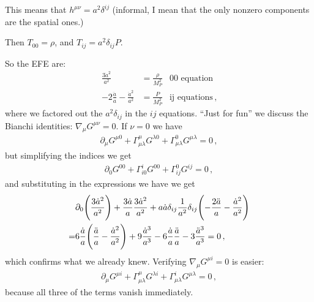\documentclass[main.tex]{subfiles}
\begin{document}
This means that \(h^{\mu \nu } = a^2 \delta^{ij}\) (informal, I mean that the only nonzero components are the spatial ones.)

Then \(T_{00} = \rho \), and \(T_{ij} = a^2 \delta_{ij} P\). 

So the EFE are: 
%
\begin{subequations}
\begin{align}
  \frac{3 \dot{a}^2}{a^2} &= \frac{\rho }{M_P^2}  & \text{00 equation}\\
  - 2 \frac{\ddot{a}}{a} - \frac{\dot{a}^2}{a^2} &=
  \frac{P}{M_P^2} & \text{ij equations}
\,,
\end{align}
\end{subequations}
%
where we factored out the \(a^2 \delta_{ij}\) in the \(ij\) equations. 
``Just for fun'' we discuss the Bianchi identities: \(\nabla_{\mu } G^{\mu \nu }=0\). 
If \(\nu =0\) we have 
%
\begin{align}
  \partial_{\mu } G^{\mu 0} + \Gamma^{\mu }_{\mu \lambda } G^{\lambda 0} + \Gamma^{0}_{\mu \lambda } G^{\mu \lambda } = 0
\,,
\end{align}
%
but simplifying the indices we get 
%
\begin{align}
  \partial_{0} G^{00} + \Gamma^{i}_{i0} G^{00} + \Gamma^{0}_{ij} G^{ij} =0
\,,
\end{align}
%
and substituting in the expressions we have we get 
%
\begin{subequations}
\begin{align}
  &\partial_{0} \qty(\frac{3 \dot{a}^2}{a^2})
  + \frac{3 \dot{a}}{a} \frac{3 \dot{a}^2}{a^2}
  + a \dot{a} \delta_{ij} \frac{1}{a^2} \delta_{ij}
  \qty(- \frac{2 \ddot{a}}{a} - \frac{\dot{a}^2}{a^2}) \\
  = & 6 \frac{\dot{a}}{a} \qty(\frac{\ddot{a}}{a} - \frac{\dot{a}^2}{a^2})
  + 9 \frac{\dot{a}^3}{a^3} - 6 \frac{\dot{a}}{a} \frac{\ddot{a}}{a} - 3 \frac{\ddot{a}^3}{a^3} = 0 
\,,
\end{align}
\end{subequations}
%
which confirms what we already knew. Verifying \(\nabla_{\mu} G^{\mu i } = 0\) is easier:  
%
\begin{align}
    \partial_{\mu } G^{\mu i} + \Gamma^{\mu }_{\mu \lambda } G^{\lambda i} + \Gamma^{i}_{\mu \lambda } G^{\mu \lambda } = 0
\,,
\end{align}
%
because all three of the terms vanish immediately. 
\end{document}
